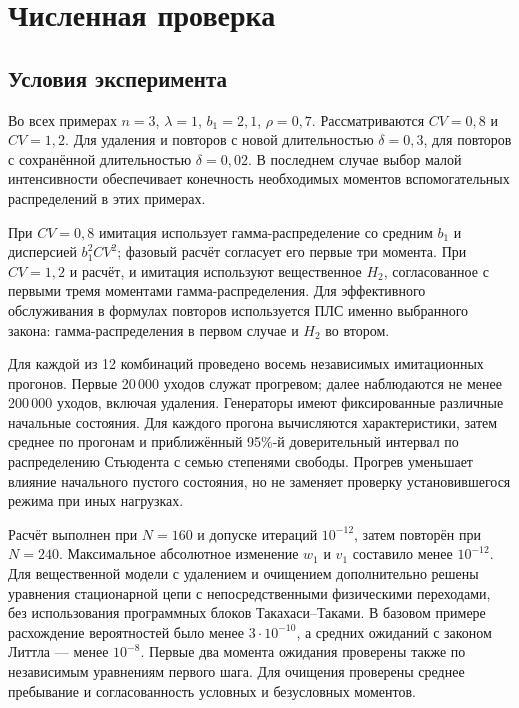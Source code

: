 \section{Численная проверка}\label{sec:results}
\subsection{Условия эксперимента}
Во всех примерах \(n=3\), \(\lambda=1\), \(b_1=2{,}1\), \(\rho=0{,}7\). Рассматриваются \(CV=0{,}8\) и \(CV=1{,}2\). Для удаления и повторов с новой длительностью \(\delta=0{,}3\), для повторов с сохранённой длительностью \(\delta=0{,}02\). В последнем случае выбор малой интенсивности обеспечивает конечность необходимых моментов вспомогательных распределений в этих примерах.

При \(CV=0{,}8\) имитация использует гамма-распределение со средним \(b_1\) и дисперсией \(b_1^2CV^2\); фазовый расчёт согласует его первые три момента. При \(CV=1{,}2\) и расчёт, и имитация используют вещественное \(H_2\), согласованное с первыми тремя моментами гамма-распределения. Для эффективного обслуживания в формулах повторов используется ПЛС именно выбранного закона: гамма-распределения в первом случае и \(H_2\) во втором.

Для каждой из 12 комбинаций проведено восемь независимых имитационных прогонов. Первые 20\,000 уходов служат прогревом; далее наблюдаются не менее 200\,000 уходов, включая удаления. Генераторы имеют фиксированные различные начальные состояния. Для каждого прогона вычисляются характеристики, затем среднее по прогонам и приближённый 95\%-й доверительный интервал по распределению Стьюдента с семью степенями свободы. Прогрев уменьшает влияние начального пустого состояния, но не заменяет проверку установившегося режима при иных нагрузках.

Расчёт выполнен при \(N=160\) и допуске итераций \(10^{-12}\), затем повторён при \(N=240\). Максимальное абсолютное изменение \(w_1\) и \(v_1\) составило менее \(10^{-12}\). Для вещественной модели с удалением и очищением дополнительно решены уравнения стационарной цепи с непосредственными физическими переходами, без использования программных блоков Такахаси--Таками. В базовом примере расхождение вероятностей было менее \(3\cdot10^{-10}\), а средних ожиданий с законом Литтла --- менее \(10^{-8}\). Первые два момента ожидания проверены также по независимым уравнениям первого шага. Для очищения проверены среднее пребывание и согласованность условных и безусловных моментов.

